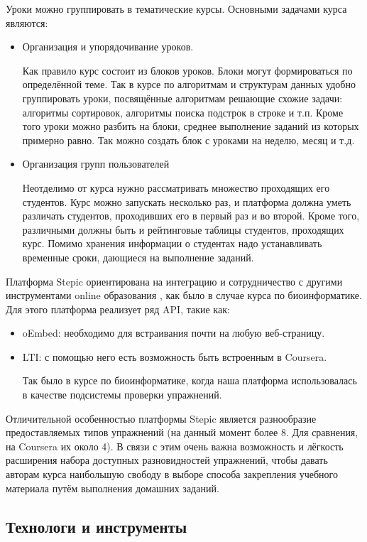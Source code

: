 \documentclass{matmex-diploma-custom}
\begin{document}
Уроки можно группировать в тематические курсы. Основными задачами
курса являются:
\begin{itemize}
\item Организация и упорядочивание уроков.

  Как правило курс состоит из блоков уроков. Блоки могут формироваться
  по определённой теме. Так в курсе по алгоритмам и структурам данных
  удобно группировать уроки, посвящённые алгоритмам решающие схожие
  задачи: алгоритмы сортировок, алгоритмы поиска подстрок в строке и
  т.п. Кроме того уроки можно разбить на блоки, среднее выполнение
  заданий из которых примерно равно. Так можно создать блок с уроками
  на неделю, месяц и т.д.
\item Организация групп пользователей

  Неотделимо от курса нужно рассматривать множество проходящих его
  студентов. Курс можно запускать несколько раз, и платформа должна
  уметь различать студентов, проходивших его в первый раз и во
  второй. Кроме того, различными должны быть и рейтинговые таблицы
  студентов, проходящих курс. Помимо хранения информации о студентах
  надо устанавливать временные сроки, дающиеся на выполнение заданий.
\end{itemize}

Платформа Stepic ориентирована на интеграцию и сотрудничество с
другими инструментами online образования \cite{dagger2007service}, как
было в случае курса по биоинформатике. Для этого платформа реализует
ряд API, такие как:
\begin{itemize}
\item oEmbed: необходимо для встраивания почти на любую веб-страницу.
\item LTI: с помощью него есть возможность быть встроенным в Coursera.

  Так было в курсе по биоинформатике, когда наша платформа
  использовалась в качестве подсистемы проверки упражнений.
\end{itemize}

Отличительной особенностью платформы Stepic является разнообразие
предоставляемых типов упражнений (на данный момент более 8. Для
сравнения, на Coursera их около 4).  В связи с этим очень важна
возможность и лёгкость расширения набора доступных разновидностей
упражнений, чтобы давать авторам курса наибольшую свободу в выборе
способа закрепления учебного материала путём выполнения домашних
заданий.

\subsection{Технологи и инструменты}
\end{document}
